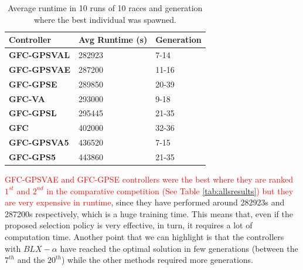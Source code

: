 \documentclass[10pt,journal,compsoc]{IEEEtran}
\begin{document}
\begin{table}[!ht]
	\centering
	{\scriptsize
          \caption{Average runtime in 10 runs of 10 races 
            and
                  generation where the best individual was spawned.}
		\label{tab:time}
		\begin{tabular}{|p{2.85cm}|p{2.20cm}|p{1.65cm}|}
			\hline  
			Controller& \textbf{Avg Runtime (s)}&\textbf{Generation}\\
\hline
\hline 	 
 \textbf{{\sf GFC-GPSVAL}} \cite{DBLP:conf/cig/SalemMG19}&282923
&7-14\\	
\textbf{{\sf GFC-GPSVAE}}&287200
&11-16\\
 \textbf{{\sf GFC-GPSE}}&289850
&20-39\\
\textbf{{\sf GFC-VA}} \cite{DBLP:conf/cig/SalemMG19}&293000
&9-18\\
 \textbf{{\sf GFC-GPSL}} \cite{DBLP:conf/cig/SalemMG19}&295445
&21-35\\
\textbf{\textbf{{\sf GFC}}} \cite{salem_cig2018}&402000
                   &32-36\\
\textbf{{\sf GFC-GPSVA5}} \cite{DBLP:conf/cig/SalemMG19}&436520
&7-15\\		
 \textbf{{\sf GFC-GPS5}} \cite{DBLP:conf/cig/SalemMG19}&443860
				&21-35\\	
					
			\hline 
		
		\end{tabular}
		
	}
\end{table} 
\textcolor{red}{{\sf GFC-GPSVAE} and {\sf GFC-GPSE} controllers were the best where
they are ranked $1^{st}$ and $2^{nd}$ in the comparative competition (See Table \ref{tab:allsresults}) but they are very expensive in runtime}, since they have performed around 282923s and 287200s respectively, which is a
huge training time. %
This means that, even if the proposed selection policy is very effective, in turn, it requires a lot of computation time.
%
Another point that we can highlight is that the controllers with
$BLX-\alpha$ have reached the optimal solution in few generations
(between the $7^{th}$ and the $20^{th}$) while the other methods required more
generations. 
\end{document}

